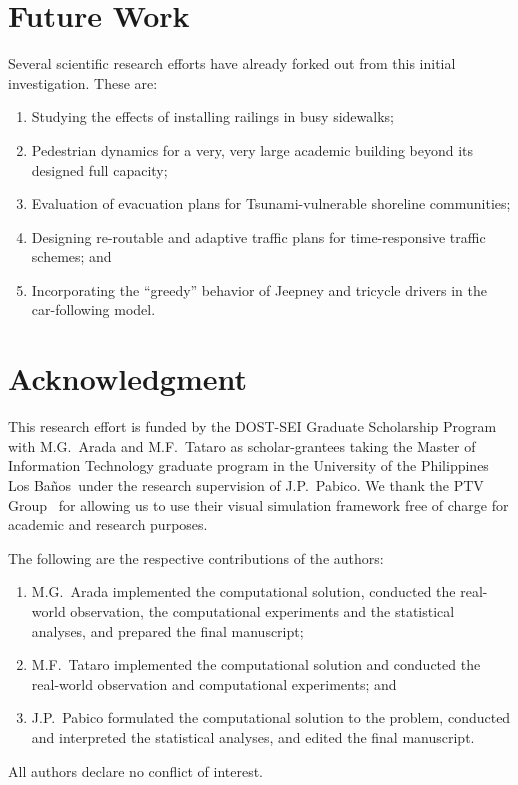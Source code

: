 \documentclass[preprint]{./acm_proc_article-sp}
\newcommand{\UPLB}{University of the Philippines Los Ba\~{n}os}
\begin{document}
\section{Future Work}
Several scientific research efforts have already forked out from this initial investigation. These are:
\begin{enumerate}
\item Studying the effects of installing railings in busy sidewalks;
\item Pedestrian dynamics for a very, very large academic building beyond its designed full capacity;
\item Evaluation of evacuation plans for Tsunami-vulnerable shoreline communities;
\item Designing re-routable and adaptive traffic plans for time-responsive traffic schemes; and
\item Incorporating the ``greedy'' behavior of Jeepney and tricycle drivers in the car-following model.
\end{enumerate}

\section{Acknowledgment}

This research effort is funded by the DOST-SEI Graduate Scholarship Program with M.G.~Arada and M.F.~Tataro as scholar-grantees taking the Master of Information Technology graduate program in the \UPLB\ under the research supervision of J.P.~Pabico. We thank the PTV Group~\citep{PTV} for allowing us to use their visual simulation framework free of charge for academic and research purposes. 

The following are the respective contributions of the authors: 
\begin{enumerate}
\item M.G.~Arada implemented the computational solution, conducted the real-world observation, the computational experiments and the statistical analyses, and prepared the final manuscript; 
\item M.F.~Tataro implemented the computational solution and conducted the real-world observation and computational experiments; and 
\item J.P.~Pabico formulated the computational solution to the problem, conducted and interpreted the statistical analyses, and edited the final manuscript. 
\end{enumerate}
All authors declare no conflict of interest.



\end{document}
